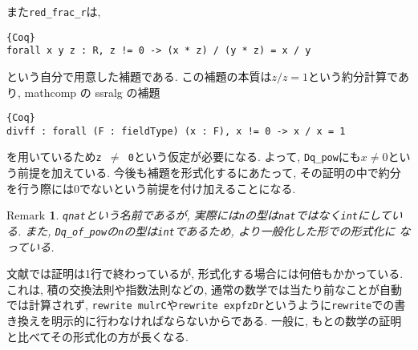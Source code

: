 \documentclass[11pt]{jsreport}
\theoremstyle{mystyle}
\newtheorem{rmk}[df]{$\textrm{Remark}$}
\newcommand{\brmk}{\begin{rmk}}
\newcommand{\ermk}{\end{rmk}}
\newcommand{\0}{\textbf{0}}
\begin{document}
また{\tt red\_frac\_r}は, 
\begin{lstlisting}{Coq}
forall x y z : R, z != 0 -> (x * z) / (y * z) = x / y \end{lstlisting}
という自分で用意した補題である. この補題の本質は$z / z = 1$という約分計算であり, mathcomp の ssralg の補題
\begin{lstlisting}{Coq}
divff : forall (F : fieldType) (x : F), x != 0 -> x / x = 1 \end{lstlisting}
を用いているため{\tt z $\neq$ 0}という仮定が必要になる. よって, {\tt Dq\_pow}にも{\tt $x \ne 0$}という前提を加えている. 今後も補題を形式化するにあたって, その証明の中で約分を行う際には$0$でないという前提を付け加えることになる. 
\brmk
  {\tt qnat}という名前であるが, 実際には{\tt n}の型は{\tt nat}ではなく{\tt int}にしている. 
  また, {\tt Dq\_of\_pow}の{\tt n}の型は{\tt int}であるため, より一般化した形での形式化に
  なっている. 
\ermk
文献\cite{Kac}では証明は1行で終わっているが, 形式化する場合には何倍もかかっている. これは, 積の交換法則や指数法則などの, 通常の数学では当たり前なことが自動では計算されず, {\tt rewrite mulrC}や{\tt rewrite expfzDr}というように{\tt rewrite}での書き換えを明示的に行わなければならないからである. 一般に, もとの数学の証明と比べてその形式化の方が長くなる. 
\end{document}
